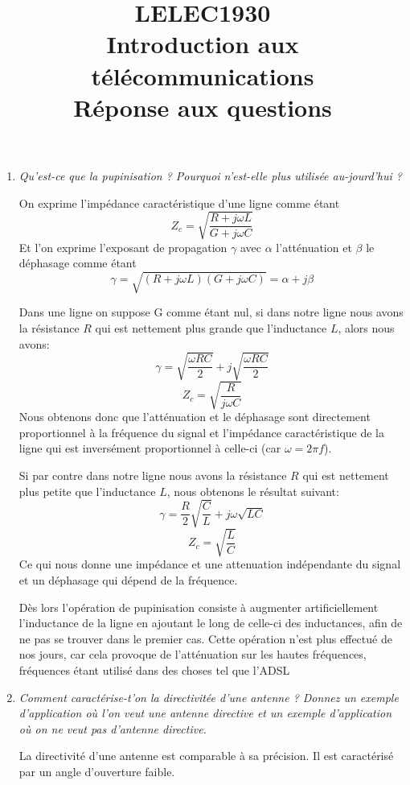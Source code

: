 \documentclass[a4paper, 11pt]{article}
\title{LELEC1930\\Introduction aux télécommunications\\Réponse aux questions}
\date{}
\begin{document}
\maketitle

\begin{enumerate}

\item \textit{Qu'est-ce que la pupinisation ? Pourquoi n'est-elle plus utilisée au-jourd'hui ?}

On exprime l'impédance caractéristique d'une ligne comme étant 
$$Z_c = \sqrt{\frac{R + j\omega L}{G + j\omega C}}$$
Et l'on exprime l'exposant de propagation $\gamma$ avec $\alpha$ l'atténuation et $\beta$ le déphasage comme étant
$$\gamma = \sqrt{(R + j\omega L)(G + j\omega C)} = \alpha + j\beta$$

Dans une ligne on suppose G comme étant nul, si dans notre ligne nous avons la résistance $R$ qui est nettement plus grande que l'inductance $L$, alors nous avons:
$$\gamma = \sqrt{\frac{\omega RC}{2}} + j\sqrt{\frac{\omega RC}{2}}$$
$$Z_c = \sqrt{\frac{R}{j\omega C}}$$
Nous obtenons donc que l'atténuation et le déphasage sont directement proportionnel à la fréquence du signal et l'impédance caractéristique de la ligne qui est inversément proportionnel à celle-ci (car $\omega = 2\pi f$).

Si par contre dans notre ligne nous avons la résistance $R$ qui est nettement plus petite que l'inductance $L$, nous obtenons le résultat suivant:
$$\gamma = \frac{R}{2}\sqrt{\frac{C}{L}} + j\omega \sqrt{LC}$$
$$Z_c = \sqrt{\frac{L}{C}}$$
Ce qui nous donne une impédance et une attenuation indépendante du signal et un déphasage qui dépend de la fréquence. 

Dès lors l'opération de pupinisation consiste à augmenter artificiellement l'inductance de la ligne en ajoutant le long de celle-ci des inductances, afin de ne pas se trouver dans le premier cas. Cette opération n'est plus effectué de nos jours, car cela provoque de l'atténuation sur les hautes fréquences, fréquences étant utilisé dans des choses tel que l'ADSL

\item \textit{Comment caractérise-t'on la directivitée d'une antenne ? Donnez un exemple d'application où l'on veut une antenne directive et un exemple d'application où on ne veut pas d'antenne directive.}

La directivité d'une antenne est comparable à sa précision. Il est caractérisé par un angle d'ouverture faible. 


\end{enumerate}
\end{document}
